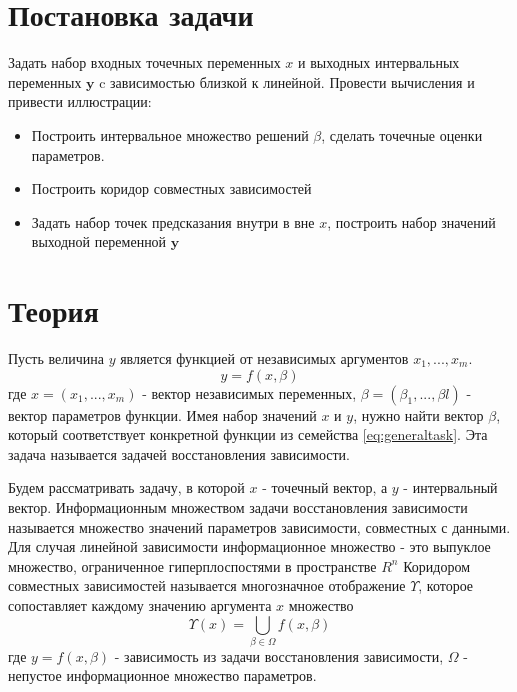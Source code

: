 \documentclass[a4paper,12pt]{article}
\begin{document}
    
    \newpage

    \tableofcontents
    \newpage

    \section{Постановка задачи}
    Задать набор входных точечных переменных $ x $ и выходных интервальных переменных $ \textbf{y} $ c зависимостью близкой к линейной. \newline
    Провести вычисления и привести иллюстрации:
    \begin{itemize}
        \item Построить интервальное множество решений $ \beta $, сделать точечные оценки параметров.
        \item Построить коридор совместных зависимостей
        \item Задать набор точек предсказания внутри в вне $ x $, построить набор значений выходной переменной $ \textbf{y} $
    \end{itemize}

    \section{Теория}
    Пусть величина $ y $ является функцией от независимых аргументов $ x_{1}, ..., x_{m} $.
    \begin{equation}
        y = f(x, \beta)
        \label{eq:generaltask}
    \end{equation}
    где $ x = (x_{1}, ..., x_{m}) $ - вектор независимых переменных, 
    $ \beta = (\beta_{1}, ..., \beta{l}) $ - вектор параметров функции. \newline
    Имея набор значений $ x $ и $ y $, нужно найти вектор $ \beta $, который соответствует конкретной функции из семейства \ref{eq:generaltask}.
    Эта задача называется задачей восстановления зависимости.\newline

    \noindent
    Будем рассматривать задачу, в которой $ x $ - точечный вектор, а $ y $ - интервальный вектор.
    Информационным множеством задачи восстановления зависимости называется множество значений параметров зависимости, совместных с данными.
    Для случая линейной зависимости информационное множество - это выпуклое множество, ограниченное гиперплоспостями в пространстве $ R^{n} $ \newline
    Коридором совместных зависимостей называется многозначное отображение $ \Upsilon $, которое сопоставляет каждому значению аргумента $ x $ множество
    \begin{equation}
         \Upsilon(x) = \bigcup_{\beta \in \Omega}f(x, \beta)
    \end{equation}
    где $ y = f(x, \beta) $ - зависимость из задачи восстановления зависимости, $ \Omega $ - непустое информационное множество параметров.
    
\end{document}
